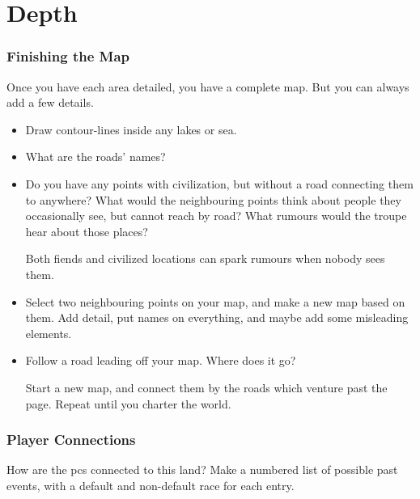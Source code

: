 \foragingChart

\section{Depth}

\begin{multicols}{2}

\subsubsection{Finishing the Map}

\noindent
Once you have each area detailed, you have a complete map.
But you can always add a few details.

\begin{itemize}
  \item
  Draw contour-lines inside any lakes or sea.
  \item
  What are the roads' names?
  \item
  Do you have any points with civilization, but without a road connecting them to anywhere?
  What would the neighbouring points think about people they occasionally see, but cannot reach by road?
  What rumours would the troupe hear about those places?

  Both fiends and civilized locations can spark rumours when nobody sees them.
  \item
  Select two neighbouring points on your map, and make a new map based on them.
  Add detail, put names on everything, and maybe add some misleading elements.
  \item
  Follow a road leading off your map.
  Where does it go?

  Start a new map, and connect them by the roads which venture past the page.
  Repeat until you charter the world.
\end{itemize}

\bigLine

\subsubsection{Player Connections}

How are the \glspl{pc} connected to this land?
Make a numbered list of possible past events, with a default and non-default race for each entry.


\end{multicols}

